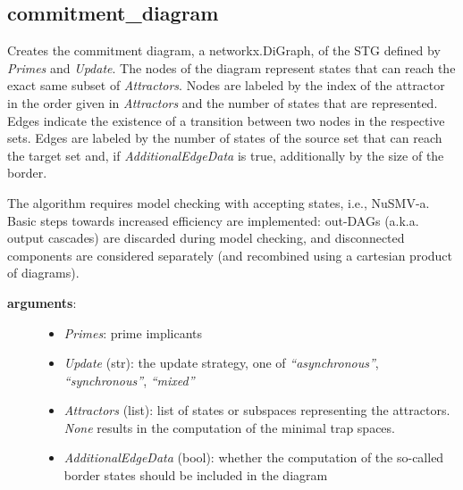 \documentclass[letterpaper,10pt,english]{sphinxmanual}
\begin{document}
\subsection{commitment\_diagram}
\label{AttractorBasins:id2}\label{AttractorBasins:commitment-diagram}

\begin{fulllineitems}
\label{AttractorBasins:PyBoolNet.AttractorBasins.commitment_diagram}
Creates the commitment diagram, a networkx.DiGraph, of the STG defined by \emph{Primes} and \emph{Update}.
The nodes of the diagram represent states that can reach the exact same subset of \emph{Attractors}.
Nodes are labeled by the index of the attractor in the order given in \emph{Attractors} and the number of states
that are represented. Edges indicate the existence of a transition between two nodes in the respective sets.
Edges are labeled by the number of states of the source set that can reach the target set and,
if \emph{AdditionalEdgeData} is true, additionally by the size of the border.

The algorithm requires model checking with accepting states, i.e., NuSMV-a.
Basic steps towards increased efficiency are implemented:
out-DAGs (a.k.a. output cascades) are discarded during model checking, and
disconnected components are considered separately (and recombined using a cartesian product of diagrams).
\begin{description}
\item[{\textbf{arguments}:}] \leavevmode\begin{itemize}
\item {} 
\emph{Primes}: prime implicants

\item {} 
\emph{Update} (str): the update strategy, one of \emph{``asynchronous''}, \emph{``synchronous''}, \emph{``mixed''}

\item {} 
\emph{Attractors} (list): list of states or subspaces representing the attractors. \emph{None} results in the computation of the minimal trap spaces.

\item {} 
\emph{AdditionalEdgeData} (bool): whether the computation of the so-called border states should be included in the diagram


\end{itemize}
\end{description}
\end{fulllineitems}
\end{document}
